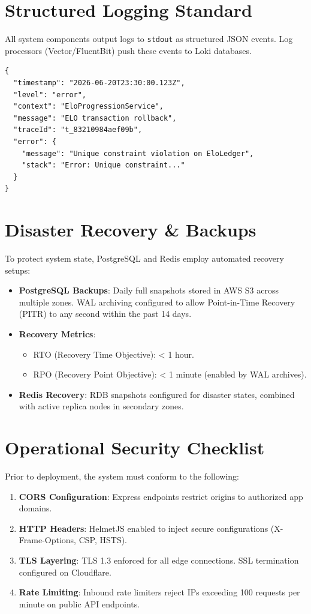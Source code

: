 \documentclass[11pt,a4paper]{report}
\begin{document}
\section{Structured Logging Standard}
All system components output logs to \texttt{stdout} as structured JSON events. Log processors (Vector/FluentBit) push these events to Loki databases.
\begin{lstlisting}[caption={Structured Logging JSON Event}]
{
  "timestamp": "2026-06-20T23:30:00.123Z",
  "level": "error",
  "context": "EloProgressionService",
  "message": "ELO transaction rollback",
  "traceId": "t_83210984aef09b",
  "error": {
    "message": "Unique constraint violation on EloLedger",
    "stack": "Error: Unique constraint..."
  }
}
\end{lstlisting}

\section{Disaster Recovery \& Backups}
To protect system state, PostgreSQL and Redis employ automated recovery setups:
\begin{itemize}
    \item \textbf{PostgreSQL Backups}: Daily full snapshots stored in AWS S3 across multiple zones. WAL archiving configured to allow Point-in-Time Recovery (PITR) to any second within the past 14 days.
    \item \textbf{Recovery Metrics}:
        \begin{itemize}
            \item RTO (Recovery Time Objective): < 1 hour.
            \item RPO (Recovery Point Objective): < 1 minute (enabled by WAL archives).
        \end{itemize}
    \item \textbf{Redis Recovery}: RDB snapshots configured for disaster states, combined with active replica nodes in secondary zones.
\end{itemize}

\section{Operational Security Checklist}
Prior to deployment, the system must conform to the following:
\begin{enumerate}
    \item \textbf{CORS Configuration}: Express endpoints restrict origins to authorized app domains.
    \item \textbf{HTTP Headers}: HelmetJS enabled to inject secure configurations (X-Frame-Options, CSP, HSTS).
    \item \textbf{TLS Layering}: TLS 1.3 enforced for all edge connections. SSL termination configured on Cloudflare.
    \item \textbf{Rate Limiting}: Inbound rate limiters reject IPs exceeding 100 requests per minute on public API endpoints.
\end{enumerate}
\end{document}
